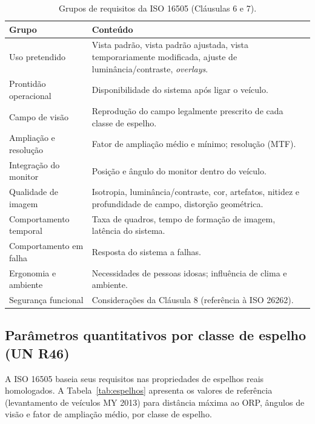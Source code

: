\documentclass[11pt,a4paper]{article}
\begin{document}
\begin{table}[H]
\centering
\caption{Grupos de requisitos da ISO 16505 (Cláusulas 6 e 7).}
\label{tab:cms}
\small
\begin{tabularx}{\linewidth}{@{}p{3.6cm}X@{}}
\toprule
\textbf{Grupo} & \textbf{Conteúdo} \\
\midrule
Uso pretendido & Vista padrão, vista padrão ajustada, vista temporariamente
modificada, ajuste de luminância/contraste, \emph{overlays}. \\
Prontidão operacional & Disponibilidade do sistema após ligar o veículo. \\
Campo de visão & Reprodução do campo legalmente prescrito de cada classe de espelho. \\
Ampliação e resolução & Fator de ampliação médio e mínimo; resolução (MTF). \\
Integração do monitor & Posição e ângulo do monitor dentro do veículo. \\
Qualidade de imagem & Isotropia, luminância/contraste, cor, artefatos, nitidez
e profundidade de campo, distorção geométrica. \\
Comportamento temporal & Taxa de quadros, tempo de formação de imagem,
latência do sistema. \\
Comportamento em falha & Resposta do sistema a falhas. \\
Ergonomia e ambiente & Necessidades de pessoas idosas; influência de clima e
ambiente. \\
Segurança funcional & Considerações da Cláusula 8 (referência à ISO 26262). \\
\bottomrule
\end{tabularx}
\end{table}

\subsection{Parâmetros quantitativos por classe de espelho (UN R46)}

A ISO 16505 baseia seus requisitos nas propriedades de espelhos reais
homologados. A Tabela~\ref{tab:espelhos} apresenta os valores de referência
(levantamento de veículos MY 2013) para distância máxima ao ORP, ângulos de
visão e fator de ampliação médio, por classe de espelho.
\end{document}
